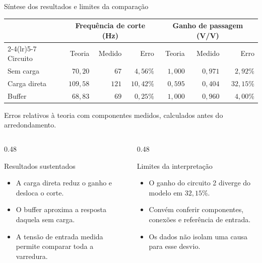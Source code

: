 \begin{frame}{Síntese dos resultados e limites da comparação}
  \small
  {\centering
    \setlength{\tabcolsep}{5pt}
    \renewcommand{\arraystretch}{0.95}
    \begin{tabular}{lrrrrrr}
      \toprule
      & \multicolumn{3}{c}{Frequência de corte (Hz)} & \multicolumn{3}{c}{Ganho de passagem (V/V)} \\
      \cmidrule(lr){2-4}\cmidrule(lr){5-7}
      Circuito & Teoria & Medido & Erro & Teoria & Medido & Erro \\
      \midrule
      Sem carga & $70{,}20$ & $67$ & $4{,}56\%$ & $1{,}000$ & $0{,}971$ & $2{,}92\%$ \\
      Carga direta & $109{,}58$ & $121$ & $10{,}42\%$ & $0{,}595$ & $0{,}404$ & $32{,}15\%$ \\
      Buffer & $68{,}83$ & $69$ & $0{,}25\%$ & $1{,}000$ & $0{,}960$ & $4{,}00\%$ \\
      \bottomrule
    \end{tabular}\par
  }

  \centering\scriptsize Erros relativos à teoria com componentes medidos, calculados antes do arredondamento.
  \par\small
  \begin{columns}[T,onlytextwidth]
    \begin{column}{0.48\textwidth}
      \begin{block}{Resultados sustentados}
        \begin{itemize}
          \item A carga direta reduz o ganho e desloca o corte.
          \item O buffer aproxima a resposta daquela sem carga.
          \item A tensão de entrada medida permite comparar toda a varredura.
        \end{itemize}
      \end{block}
    \end{column}
    \begin{column}{0.48\textwidth}
      \begin{alertblock}{Limites da interpretação}
        \begin{itemize}
          \item O ganho do circuito 2 diverge do modelo em $32{,}15\%$.
          \item Convém conferir componentes, conexões e referência de entrada.
          \item Os dados não isolam uma causa para esse desvio.
        \end{itemize}
      \end{alertblock}
    \end{column}
  \end{columns}
\end{frame}
